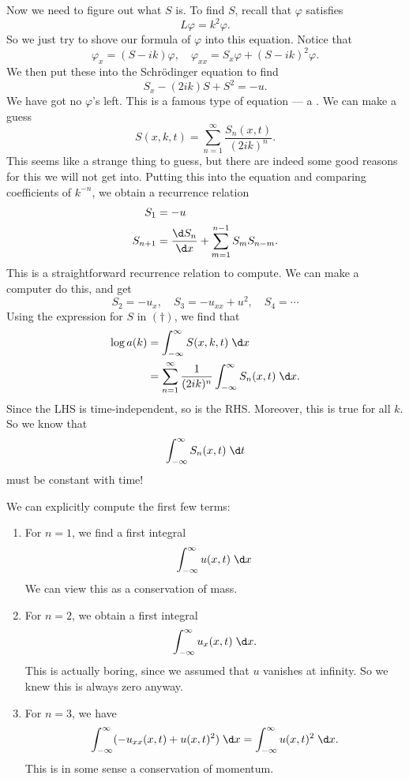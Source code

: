 \documentclass[a4paper]{article}
\begin{document}
Now we need to figure out what $S$ is. To find $S$, recall that $\varphi$ satisfies
\[
  L\varphi = k^2 \varphi.
\]
So we just try to shove our formula of $\varphi$ into this equation. Notice that
\[
  \varphi_x = (S - ik) \varphi,\quad \varphi_{xx} = S_x \varphi + (S - ik)^2 \varphi.
\]
We then put these into the Schr\"odinger equation to find
\[
  S_x - (2ik)S + S^2 = -u.
\]
We have got no $\varphi$'s left. This is a famous type of equation --- a . We can make a guess
\[
  S(x, k, t) = \sum_{n = 1}^\infty \frac{S_n(x, t)}{(2ik)^n}.
\]
This seems like a strange thing to guess, but there are indeed some good reasons for this we will not get into. Putting this into the equation and comparing coefficients of $k^{-n}$, we obtain a recurrence relation
\begin{align*}
  S_1 &= -u\\
  S_{n + 1} &= \frac{\d S_n}{\d x} + \sum_{m = 1}^{n - 1} S_m S_{n - m}.
\end{align*}
This is a straightforward recurrence relation to compute. We can make a computer do this, and get
\[
  S_2 = -u_x,\quad S_3 = -u_{xx} + u^2,\quad S_4 = \cdots
\]
Using the expression for $S$ in $(\dagger)$, we find that
\begin{align*}
  \log a(k) &= \int_{-\infty}^\infty S(x, k, t) \;\d x\\
  &= \sum_{n = 1}^\infty \frac{1}{(2ik)^n} \int_{-\infty}^\infty S_n(x, t)\;\d x.
\end{align*}
Since the LHS is time-independent, so is the RHS. Moreover, this is true for all $k$. So we know that
\[
  \int_{-\infty}^\infty S_n (x, t)\;\d t
\]
must be constant with time!

We can explicitly compute the first few terms:
\begin{enumerate}
  \item For $n = 1$, we find a first integral
    \[
      \int_{-\infty}^\infty u(x, t)\;\d x
    \]
    We can view this as a conservation of mass.

  \item For $n = 2$, we obtain a first integral
    \[
      \int_{-\infty}^\infty u_x(x, t)\;\d x.
    \]
    This is actually boring, since we assumed that $u$ vanishes at infinity. So we knew this is always zero anyway.

  \item For $n = 3$, we have
    \[
      \int_{-\infty}^\infty (-u_{xx}(x, t) + u(x, t)^2) \;\d x = \int_{-\infty}^\infty u(x, t)^2 \;\d x.
    \]
    This is in some sense a conservation of momentum.
\end{enumerate}
\end{document}
